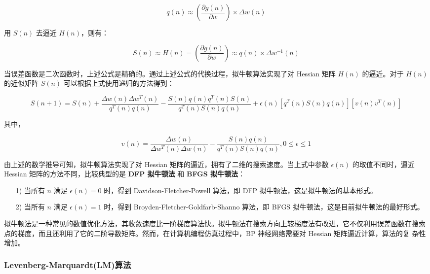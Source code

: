 \documentclass[UTF8]{ctexart}
\begin{document}
\begin{equation}
q(n) \approx (\frac{\partial g(n)}{\partial w}) \times \Delta w(n)
\end{equation}

用 $S(n)$ 去逼近 $H(n)$，则有：

\begin{equation}
S(n) \approx H(n) = (\frac{\partial g(n)}{\partial w}) \approx q(n) \times \Delta w^{-1}(n)
\end{equation}

当误差函数是二次函数时，上述公式是精确的。通过上述公式的代换过程，拟牛顿算法实现了对 Hessian 矩阵 $H(n)$ 的逼近。对于 $H(n)$ 的近似矩阵 $S(n)$ 可以根据上式使用递归的方法得到： \par

\begin{equation}
S(n+1) = S(n) + \frac{\Delta w(n) \Delta w^T(n)}{q^T(n) q(n)} - \frac{S(n) q(n) q^T(n) S(n)}{q^T(n) S(n) q(n)} + \epsilon(n)[q^T(n) S(n) q(n)][v(n)v^T(n)]
\end{equation}

其中，

\begin{equation}
v(n) = \frac{\Delta w(n)}{\Delta w^T(n) \Delta w(n)} - \frac{S(n)q(n)}{q^T(n)S(n)q(n)}, 0 \le \epsilon \le 1
\end{equation}

由上述的数学推导可知，拟牛顿算法实现了对 Hessian 矩阵的逼近，拥有了二维的搜索速度。当上式中参数 $\epsilon(n)$ 的取值不同时，逼近 Hessian 矩阵的方法不同，比较典型的是\textbf{ DFP 拟牛顿法} 和 \textbf{BFGS 拟牛顿法}：

\begin{itemize}
\item [1)] 当所有 $n$ 满足 $\epsilon(n) = 0$ 时，得到 Davidson-Fletcher-Powell 算法，即 DFP 拟牛顿法，这是拟牛顿法的基本形式。
\item [2)] 当所有 $n$ 满足 $\epsilon(n) = 1$ 时，得到 Broyden-Fletcher-Goldfarb-Shanno 算法，即 BFGS 拟牛顿法，这是目前拟牛顿法的最好形式。
\end{itemize}

拟牛顿法是一种常见的数值优化方法，其收敛速度比一阶梯度算法快。拟牛顿法在搜索方向上较梯度法有改进，它不仅利用误差函数在搜索点的梯度，而且还利用了它的二阶导数矩阵。然而，在计算机编程仿真过程中，BP 神经网络需要对 Hessian 矩阵逼近计算，算法的复
杂性增加。

\subsubsection{Levenberg-Marquardt(LM)算法}
\end{document}
